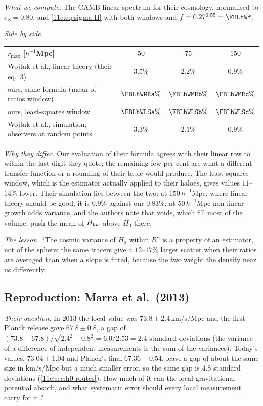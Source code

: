 \emph{What we compute.} The CAMB linear spectrum for their cosmology, normalised to
$\sigma_8=0.80$, and \eqref{11c:eq:sigma-H} with both windows and $f=0.27^{0.55}=\FBLhWf$.

\emph{Side by side.}
\begin{center}
\small
\begin{tabular}{@{}lccc@{}}
\toprule
$r_{\max}$ [$h^{-1}$Mpc] & $50$ & $75$ & $150$\\
\midrule
Wojtak et al., linear theory (their eq.~3) & $3.5\%$ & $2.2\%$ & $0.9\%$\\
ours, same formula (mean-of-ratios window) & $\FBLhWMRa\%$ & $\FBLhWMRb\%$ & $\FBLhWMRc\%$\\
ours, least-squares window & $\FBLhWLSa\%$ & $\FBLhWLSb\%$ & $\FBLhWLSc\%$\\
Wojtak et al., simulation, observers at random points & $3.3\%$ & $2.1\%$ & $0.9\%$\\
\bottomrule
\end{tabular}
\end{center}

\emph{Why they differ.} Our evaluation of their formula agrees with their linear
row to within the last digit they quote; the remaining few per cent are what a
different transfer function or a rounding of their table would produce. The
least-squares window, which is the estimator actually applied to their haloes,
gives values $11$--$14\%$ lower. Their simulation lies between the two: at
$150\,h^{-1}$Mpc, where linear theory should be good, it is $0.9\%$ against our $0.83\%$;
at $50\,h^{-1}$Mpc non-linear growth adds variance, and the authors note that voids,
which fill most of the volume, push the mean of $H_{\rm loc}$ above $H_0$ there.

\emph{The lesson.} ``The cosmic variance of $H_0$ within $R$'' is a property of an
estimator, not of the sphere: the same tracers give a $12$--$17\%$ larger scatter when
their ratios are averaged than when a slope is fitted, because the two weight the
density near us differently.

\subsection{Reproduction: Marra et al.\ (2013)}
\label{11c:sec:marra}

\emph{Their question.} In 2013 the local value was $73.8\pm2.4$\,km/s/Mpc and the first
Planck release gave $67.8\pm0.8$, a gap of
$(73.8-67.8)/\sqrt{2.4^2+0.8^2}=6.0/2.53=2.4$ standard deviations (the variance of a
difference of independent measurements is the sum of the variances). Today's values,
$73.04\pm1.04$ and Planck's final $67.36\pm0.54$, leave a gap of about the same size in
km/s/Mpc but a much smaller error, so the same gap is $4.8$ standard deviations
(\cref{11c:sec:h0-routes}). How much of it can the local
gravitational potential absorb, and what systematic error should every local
measurement carry for it \cite{Marra2013}?

